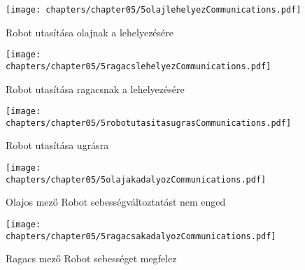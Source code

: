 \begin{figure}[h]
	\begin{center}
		\texttt{[image: chapters/chapter05/5olajlehelyezCommunications.pdf]}
		\caption{Robot utasítása olajnak a lehelyezésére}
		\label{fig:5robotolajlehelyezCommunication}
	\end{center}
\end{figure}

\begin{figure}[h]
	\begin{center}
		\texttt{[image: chapters/chapter05/5ragacslehelyezCommunications.pdf]}
		\caption{Robot utasítása ragacsnak a lehelyezésére}
		\label{fig:5robotragacslehelyezCommunication}
	\end{center}
\end{figure}

\begin{figure}[h]
	\begin{center}
		\texttt{[image: chapters/chapter05/5robotutasitasugrasCommunications.pdf]}
		\caption{Robot utasítása ugrásra}
		\label{fig:5robotutasitugrasCommunication}
	\end{center}
\end{figure}

\begin{figure}[h]
	\begin{center}
		\texttt{[image: chapters/chapter05/5olajakadalyozCommunications.pdf]}
		\caption{Olajos mező Robot sebességváltoztatást nem enged}
		\label{fig:5olajakadalyozCommunication}
	\end{center}
\end{figure}

\begin{figure}[h]
	\begin{center}
		\texttt{[image: chapters/chapter05/5ragacsakadalyozCommunications.pdf]}
		\caption{Ragacs mező Robot sebességet megfelez}
		\label{fig:5ragacsakadalyozCommunication}
	\end{center}
\end{figure}

\clearpage

